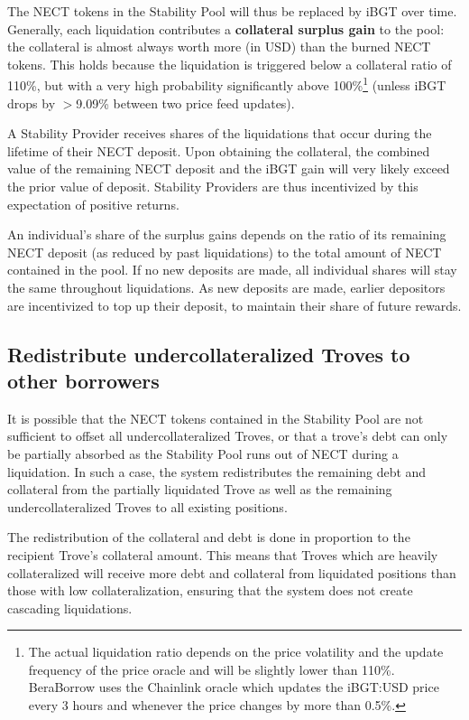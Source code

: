 \documentclass{article}
\begin{document}
The NECT tokens in the Stability Pool will thus be replaced by iBGT over time. Generally, each liquidation contributes a \textbf{collateral surplus gain} to the pool: the collateral is almost always worth more (in USD) than the burned NECT tokens. This holds because the liquidation is triggered below a collateral ratio of 110\%, but with a very high probability significantly above 100\%\footnote{The actual liquidation ratio depends on the price volatility and the update frequency of the price oracle and will be slightly lower than 110\%. BeraBorrow uses the Chainlink oracle which updates the iBGT:USD price every 3 hours and whenever the price changes by more than 0.5\%.} (unless iBGT drops by $>$9.09\% between two price feed updates).

A Stability Provider receives shares of the liquidations that occur during the lifetime of their NECT deposit. Upon obtaining the collateral, the combined value of the remaining NECT deposit and the iBGT gain will very likely exceed the prior value of deposit. Stability Providers are thus incentivized by this expectation of positive returns.

An individual’s share of the surplus gains depends on the ratio of its remaining NECT deposit (as reduced by past liquidations) to the total amount of NECT contained in the pool. If no new deposits are made, all individual shares will stay the same throughout liquidations. As new deposits are made, earlier depositors are incentivized to top up their deposit, to maintain their share of future rewards.

\subsection{Redistribute undercollateralized Troves to other borrowers}
It is possible that the NECT tokens contained in the Stability Pool are not sufficient to offset all undercollateralized Troves, or that a trove’s debt can only be partially absorbed as the Stability Pool runs out of NECT during a liquidation. In such a case, the system redistributes the remaining debt and collateral from the partially liquidated Trove as well as the remaining undercollateralized Troves to all existing positions.

The redistribution of the collateral and debt is done in proportion to the recipient Trove’s collateral amount. This means that Troves which are heavily collateralized will receive more debt and collateral from liquidated positions than those with low collateralization, ensuring that the system does not create cascading liquidations.\\
\end{document}
